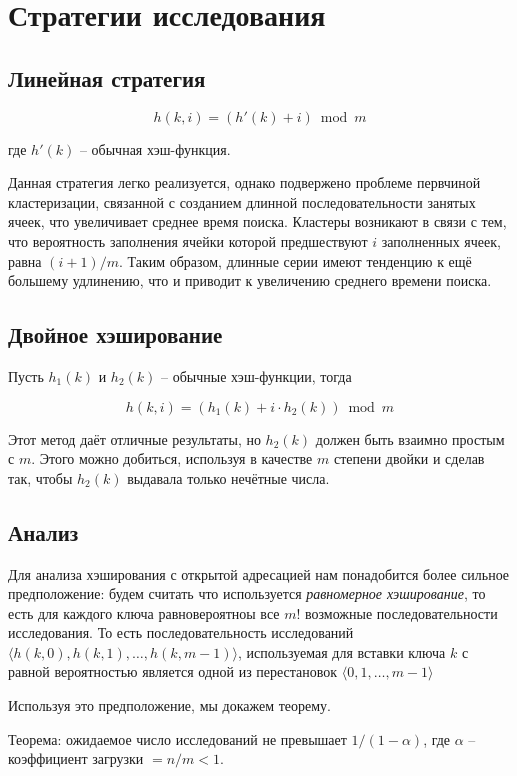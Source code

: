 \documentclass[a4paper,11pt]{article}
\begin{document}
\section{Стратегии исследования}

\subsection{Линейная стратегия}

$$
h(k, i) = (h'(k) + i) \bmod m
$$

где $h'(k)$ -- обычная хэш-функция.

Данная стратегия легко реализуется, однако подвержено проблеме первчиной
кластеризации, связанной с созданием длинной последовательности занятых ячеек,
что увеличивает среднее время поиска. Кластеры возникают в связи с тем, что
вероятность заполнения ячейки которой предшествуют $i$ заполненных ячеек, равна
$(i+1)/m$. Таким образом, длинные серии имеют тенденцию к ещё большему
удлинению, что и приводит к увеличению среднего времени поиска.

\subsection{Двойное хэширование}

Пусть $h_1(k)$ и $h_2(k)$ -- обычные хэш-функции, тогда

$$
h(k, i) = (h_1(k) + i \cdot h_2(k)) \bmod m
$$

Этот метод даёт отличные результаты, но $h_2(k)$ должен быть взаимно простым с
$m$. Этого можно добиться, используя в качестве $m$ степени двойки и сделав так,
чтобы $h_2(k)$ выдавала только нечётные числа.

\subsection{Анализ}

Для анализа хэширования с открытой адресацией нам понадобится более сильное
предположение: будем считать что используется \emph{равномерное хэширование}, то есть
для каждого ключа равновероятноы все $m!$ возможные последовательности
исследования. То есть последовательность исследований $\langle h(k,0), h(k,1),
\ldots, h(k,m-1) \rangle$, используемая для вставки ключа $k$ с равной
вероятностью является одной из перестановок $\langle 0,1,\ldots,m-1 \rangle$

Используя это предположение, мы докажем теорему.

Теорема: ожидаемое число исследований не превышает $1/(1-\alpha)$, где $\alpha$ --
коэффициент загрузки $ = n/m < 1 $.
\end{document}
